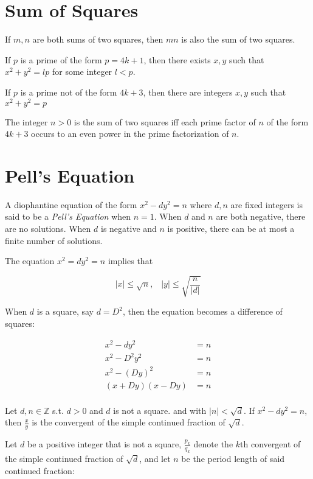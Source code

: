\documentclass{article}
\begin{document}
\begin{multicols*}{2}
\section{Sum of Squares}

If $m,n$ are both sums of two squares, then $mn$ is also the sum of two squares.

If $p$ is a prime of the form $p = 4k + 1$, then there exists $x,y$ such that $x^2 + y^2 = lp$ for some integer $l < p$.

If $p$ is a prime not of the form $4k + 3$, then there are integers $x, y$ such that $x^2 + y^2 = p$

The integer $n > 0$ is the sum of two squares iff each prime factor of $n$ of the form $4k +3$ occurs to an even power in the prime factorization of $n$.

\section{Pell's Equation}

A diophantine equation of the form $x^2 - dy^2 = n$ where $d,n$ are fixed integers is said to be a \textit{Pell's Equation} when $n = 1$. When $d$ and $n$ are both negative, there are no solutions. When $d$ is negative and $n$ is positive, there can be at most a finite number of solutions.

The equation $x^2 = dy^2 = n$ implies that

\[|x| \leq \sqrt{n},\;\;\;|y| \leq \sqrt{\frac{n}{|d|}}\]

When $d$ is a square, say $d = D^2$, then the equation becomes a difference of squares:

\[
\begin{aligned}
x^2 - dy^2 &= n \\
x^2 - D^2y^2 &= n \\
x^2 - (Dy)^2 &= n \\
(x+Dy)(x-Dy) &= n \\
\end{aligned}
\]

Let $d,n \in \mathbb{Z}$ s.t. $d > 0$ and $d$ is not a square. and with $|n| < \sqrt{d}$. If $x^2 - dy^2 = n$, then $\frac{x}{y}$ is the convergent of the simple continued fraction of $\sqrt{d}$.

Let $d$ be a positive integer that is not a square, $\frac{p_k}{q_k}$ denote the $k$th convergent of the simple continued fraction of $\sqrt{d}$, and let $n$ be the period length of said continued fraction:


\end{multicols*}
\end{document}
